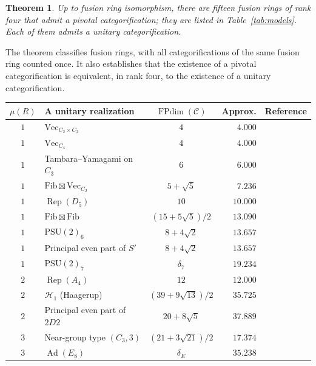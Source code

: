 \documentclass[11pt]{amsart}
\newtheorem{theorem}{Theorem}[section]
\theoremstyle{definition}
\DeclareMathOperator{\FPdim}{FPdim}
\DeclareMathOperator{\Rep}{Rep}
\DeclareMathOperator{\Ad}{Ad}
\newcommand{\Fib}{\mathrm{Fib}}
\numberwithin{equation}{section}
\begin{document}
\begin{theorem}\label{thm:main}
Up to fusion ring isomorphism, there are fifteen fusion rings of rank four that admit a pivotal categorification; they are listed in Table~\ref{tab:models}. Each of them admits a unitary categorification.
\end{theorem}

The theorem classifies fusion rings, with all categorifications of the
same fusion ring counted once.
It also establishes that the existence of a
pivotal categorification is equivalent, in rank four, to the existence of
a unitary categorification. 

\begin{table}[ht]
\centering\small
\begin{tabular}{@{}clcrl@{}}
\toprule
$\mu(R)$ & A unitary realization & $\FPdim(\mathcal C)$ & Approx. & Reference \\
\midrule
$1$ & $\mathrm{Vec}_{C_2\times C_2}$ & $4$ & $4.000$ & \cite[\S3.4]{LPR} \\
$1$ & $\mathrm{Vec}_{C_4}$ & $4$ & $4.000$ & \cite[\S3.4]{LPR} \\
$1$ & Tambara--Yamagami on $C_3$ & $6$ & $6.000$ & \cite{TambaraYamagami} \\
$1$ & $\Fib\boxtimes\mathrm{Vec}_{C_2}$ & $5+\sqrt{5}$ & $7.236$ & \cite[\S3.4]{LPR} \\
$1$ & $\Rep(D_5)$ & $10$ & $10.000$ & \cite[\S3.4]{LPR} \\
$1$ & $\Fib\boxtimes\Fib$ & $(15+5\sqrt{5})/2$ & $13.090$ & \cite[\S3.4]{LPR} \\
$1$ & $\mathrm{PSU}(2)_6$ & $8+4\sqrt{2}$ & $13.657$ & \cite[Theorem 3.1]{EIP} \\
$1$ & Principal even part of $S'$ & $8+4\sqrt{2}$ & $13.657$ & \cite[Theorem 1]{LMP} \\
$1$ & $\mathrm{PSU}(2)_7$ & $\delta_7$ & $19.234$ & \cite[\S3.4]{LPR} \\
$2$ & $\Rep(A_4)$ & $12$ & $12.000$ & \cite[Theorem 1.1]{Larson} \\
$2$ & $\mathcal H_1$ (Haagerup) & $(39+9\sqrt{13})/2$ & $35.725$ & \cite[Table 2]{GrossmanSnyder} \\
$2$ & Principal even part of $2D2$ & $20+8\sqrt{5}$ & $37.889$ & \cite[Theorem 3.1]{EIP} \\
$3$ & Near-group type $(C_3,3)$ & $(21+3\sqrt{21})/2$ & $17.374$ & \cite[Example 9.4]{IzumiNear} \\
$3$ & $\Ad(E_8)$ & $\delta_E$ & $35.238$ & \cite{IzumiE8,EvansJones} \\

\end{tabular}
\end{table}
\end{document}
